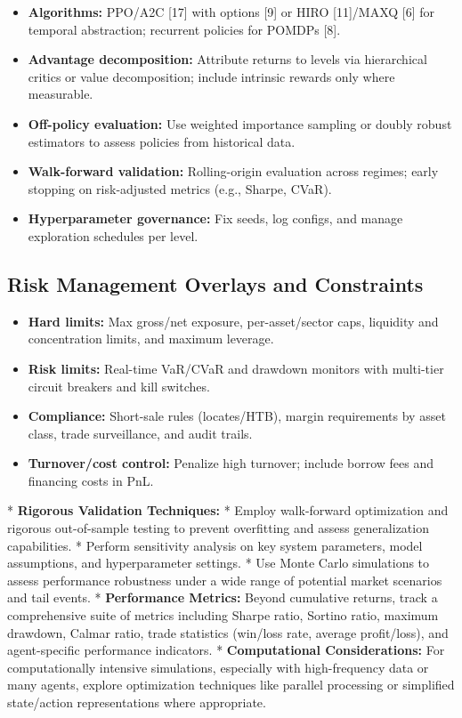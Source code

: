 \documentclass[11pt,a4paper]{article}
\begin{document}
\begin{itemize}
\item   \textbf{Algorithms:} PPO/A2C [17] with options [9] or HIRO [11]/MAXQ [6] for temporal abstraction; recurrent policies for POMDPs [8].
\item   \textbf{Advantage decomposition:} Attribute returns to levels via hierarchical critics or value decomposition; include intrinsic rewards only where measurable.
\item   \textbf{Off-policy evaluation:} Use weighted importance sampling or doubly robust estimators to assess policies from historical data.
\item   \textbf{Walk-forward validation:} Rolling-origin evaluation across regimes; early stopping on risk-adjusted metrics (e.g., Sharpe, CVaR).
\item   \textbf{Hyperparameter governance:} Fix seeds, log configs, and manage exploration schedules per level.

\end{itemize}
\subsection{Risk Management Overlays and Constraints}

\begin{itemize}
\item   \textbf{Hard limits:} Max gross/net exposure, per-asset/sector caps, liquidity and concentration limits, and maximum leverage.
\item   \textbf{Risk limits:} Real-time VaR/CVaR and drawdown monitors with multi-tier circuit breakers and kill switches.
\item   \textbf{Compliance:} Short-sale rules (locates/HTB), margin requirements by asset class, trade surveillance, and audit trails.
\item   \textbf{Turnover/cost control:} Penalize high turnover; include borrow fees and financing costs in PnL.
\end{itemize}
    *   \textbf{Rigorous Validation Techniques:}
        *   Employ walk-forward optimization and rigorous out-of-sample testing to prevent overfitting and assess generalization capabilities.
        *   Perform sensitivity analysis on key system parameters, model assumptions, and hyperparameter settings.
        *   Use Monte Carlo simulations to assess performance robustness under a wide range of potential market scenarios and tail events.
    *   \textbf{Performance Metrics:} Beyond cumulative returns, track a comprehensive suite of metrics including Sharpe ratio, Sortino ratio, maximum drawdown, Calmar ratio, trade statistics (win/loss rate, average profit/loss), and agent-specific performance indicators.
    *   \textbf{Computational Considerations:} For computationally intensive simulations, especially with high-frequency data or many agents, explore optimization techniques like parallel processing or simplified state/action representations where appropriate.
\end{document}
